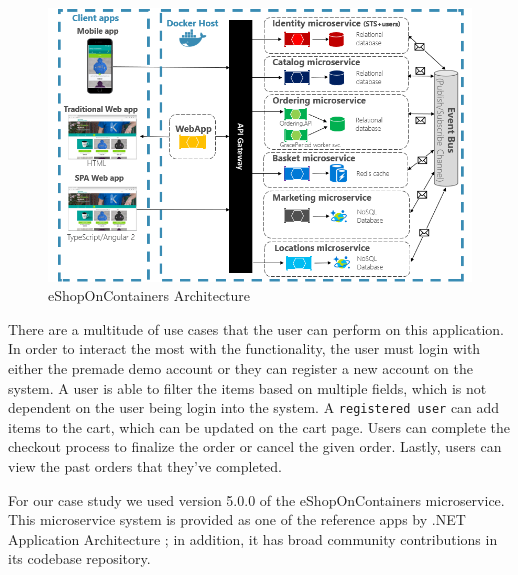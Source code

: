 \begin{figure}[h]
    \centering
    \includegraphics[width=\columnwidth]{img/eshop-architecture-2.png}
       \caption{eShopOnContainers Architecture \cite{eshop}}
       \label{fig:eshop}
\end{figure}

There are a multitude of use cases that the user can perform on this application. In order to interact the most with the functionality, the user must login with either the premade demo account or they can register a new account on the system. A user is able to filter the items based on multiple fields, which is not dependent on the user being login into the system. A \texttt{registered user} can add items to the cart, which can be updated on the cart page. Users can complete the checkout process to finalize the order or cancel the given order. Lastly, users can view the past orders that they've completed.

 For our case study we used version 5.0.0 of the eShopOnContainers microservice. This microservice system is provided as one of the reference apps by .NET Application Architecture \cite{eshop}; in addition, it has broad community contributions in its codebase repository.



